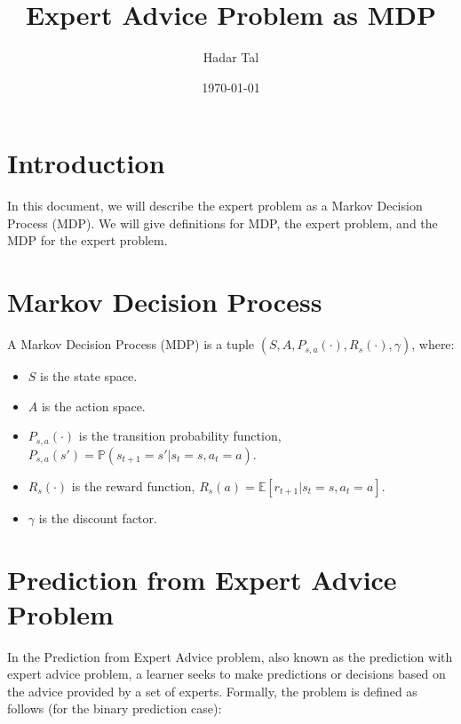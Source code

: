 \documentclass[a4paper, 12pt]{article}
\title{Expert Advice Problem as MDP}
\author{Hadar Tal}
\date{\today}
\begin{document}
\maketitle

\section*{Introduction}

In this document, we will describe the expert problem as a Markov Decision Process (MDP). 
We will give definitions for MDP, the expert problem, and the MDP for the expert problem.


\section*{Markov Decision Process}

A Markov Decision Process (MDP) is a tuple $(S, A, P_{s,a}(\cdot) , R_s(\cdot), \gamma)$, where:
\begin{itemize}
    \item $S$ is the state space.
    \item $A$ is the action space.
    \item $P_{s,a}(\cdot)$ is the transition probability function, $P_{s,a}(s') = \mathbb{P}(s_{t+1} = s' | s_t = s, a_t = a)$.
    \item $R_s(\cdot)$ is the reward function, $R_s(a) = \mathbb{E}[r_{t+1} | s_t = s, a_t = a]$.
    \item $\gamma$ is the discount factor.
\end{itemize}



\section*{Prediction from Expert Advice Problem}

In the Prediction from Expert Advice problem, also known as the prediction with expert advice problem, 
a learner seeks to make predictions or decisions based on the advice provided by a set of experts. 
Formally, the problem is defined as follows (for the binary prediction case):
\end{document}
